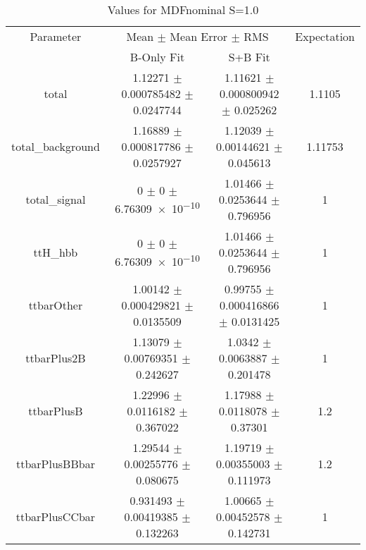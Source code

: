 \begin{table}
\centering
\caption{Values for MDFnominal S=1.0}
\begin{tabular}{cccc}
\toprule
Parameter & \multicolumn{2}{c}{Mean $\pm$ Mean Error $\pm$ RMS} & Expectation\\
 & B-Only Fit & S+B Fit & \\
\midrule
total & \num{1.12271} $\pm$ \num{0.000785482} $\pm$ \num{0.0247744} & \num{1.11621} $\pm$ \num{0.000800942} $\pm$ \num{0.025262} & \num{1.1105}\\
total\_background & \num{1.16889} $\pm$ \num{0.000817786} $\pm$ \num{0.0257927} & \num{1.12039} $\pm$ \num{0.00144621} $\pm$ \num{0.045613} & \num{1.11753}\\
total\_signal & \num{0} $\pm$ \num{0} $\pm$ \num{6.76309e-10} & \num{1.01466} $\pm$ \num{0.0253644} $\pm$ \num{0.796956} & \num{1}\\
ttH\_hbb & \num{0} $\pm$ \num{0} $\pm$ \num{6.76309e-10} & \num{1.01466} $\pm$ \num{0.0253644} $\pm$ \num{0.796956} & \num{1}\\
ttbarOther & \num{1.00142} $\pm$ \num{0.000429821} $\pm$ \num{0.0135509} & \num{0.99755} $\pm$ \num{0.000416866} $\pm$ \num{0.0131425} & \num{1}\\
ttbarPlus2B & \num{1.13079} $\pm$ \num{0.00769351} $\pm$ \num{0.242627} & \num{1.0342} $\pm$ \num{0.0063887} $\pm$ \num{0.201478} & \num{1}\\
ttbarPlusB & \num{1.22996} $\pm$ \num{0.0116182} $\pm$ \num{0.367022} & \num{1.17988} $\pm$ \num{0.0118078} $\pm$ \num{0.37301} & \num{1.2}\\
ttbarPlusBBbar & \num{1.29544} $\pm$ \num{0.00255776} $\pm$ \num{0.080675} & \num{1.19719} $\pm$ \num{0.00355003} $\pm$ \num{0.111973} & \num{1.2}\\
ttbarPlusCCbar & \num{0.931493} $\pm$ \num{0.00419385} $\pm$ \num{0.132263} & \num{1.00665} $\pm$ \num{0.00452578} $\pm$ \num{0.142731} & \num{1}\\
\bottomrule
\end{tabular}
\end{table}